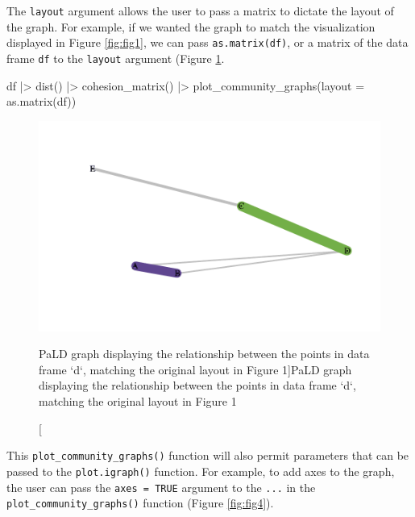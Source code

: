 The \texttt{layout} argument allows the user to pass a matrix to dictate
the layout of the graph. For example, if we wanted the graph to match
the visualization displayed in Figure \ref{fig:fig1}, we can pass
\texttt{as.matrix(df)}, or a matrix of the data frame \texttt{df} to the
\texttt{layout} argument (Figure \ref{fig:fig3}.

\begin{Schunk}
\begin{Sinput}
df |>
  dist() |>
  cohesion_matrix() |>
  plot_community_graphs(layout = as.matrix(df))
\end{Sinput}
\begin{figure}
\includegraphics{manuscript_files/figure-latex/fig3-1} \caption[PaLD graph displaying the relationship between the points in data frame `d`, matching the original layout in Figure 1]{PaLD graph displaying the relationship between the points in data frame `d`, matching the original layout in Figure 1}\label{fig:fig3}
\end{figure}
\end{Schunk}

This \texttt{plot\_community\_graphs()} function will also permit
parameters that can be passed to the \texttt{plot.igraph()} function.
For example, to add axes to the graph, the user can pass the
\texttt{axes\ =\ TRUE} argument to the \texttt{...} in the
\texttt{plot\_community\_graphs()} function (Figure \ref{fig:fig4}).

